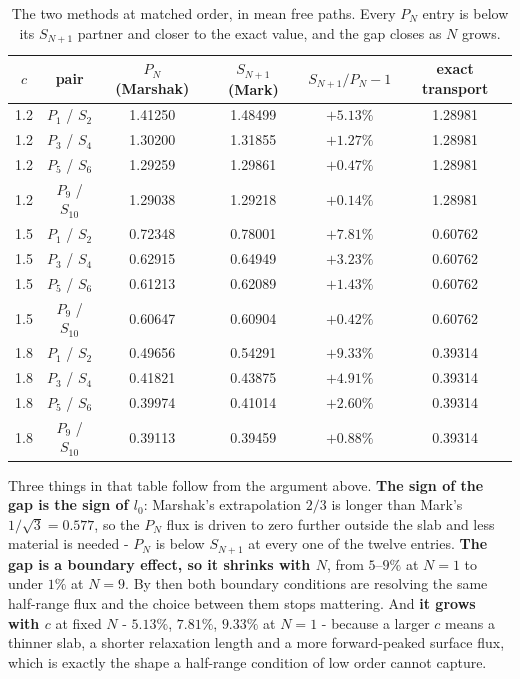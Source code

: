 \documentclass[11pt]{article}
\begin{document}
\begin{table}[htbp]
\centering
\begin{tabular}{cccccc}
\toprule
$c$ & pair & $P_N$ (Marshak) & $S_{N+1}$ (Mark) & $S_{N+1}/P_N - 1$ & exact transport \\
\midrule
1.2 & $P_1$ / $S_2$    & 1.41250 & 1.48499 & $+5.13\%$ & 1.28981 \\
1.2 & $P_3$ / $S_4$    & 1.30200 & 1.31855 & $+1.27\%$ & 1.28981 \\
1.2 & $P_5$ / $S_6$    & 1.29259 & 1.29861 & $+0.47\%$ & 1.28981 \\
1.2 & $P_9$ / $S_{10}$ & 1.29038 & 1.29218 & $+0.14\%$ & 1.28981 \\
\midrule
1.5 & $P_1$ / $S_2$    & 0.72348 & 0.78001 & $+7.81\%$ & 0.60762 \\
1.5 & $P_3$ / $S_4$    & 0.62915 & 0.64949 & $+3.23\%$ & 0.60762 \\
1.5 & $P_5$ / $S_6$    & 0.61213 & 0.62089 & $+1.43\%$ & 0.60762 \\
1.5 & $P_9$ / $S_{10}$ & 0.60647 & 0.60904 & $+0.42\%$ & 0.60762 \\
\midrule
1.8 & $P_1$ / $S_2$    & 0.49656 & 0.54291 & $+9.33\%$ & 0.39314 \\
1.8 & $P_3$ / $S_4$    & 0.41821 & 0.43875 & $+4.91\%$ & 0.39314 \\
1.8 & $P_5$ / $S_6$    & 0.39974 & 0.41014 & $+2.60\%$ & 0.39314 \\
1.8 & $P_9$ / $S_{10}$ & 0.39113 & 0.39459 & $+0.88\%$ & 0.39314 \\
\bottomrule
\end{tabular}
\caption{The two methods at matched order, in mean free paths. Every $P_N$ entry is below its
$S_{N+1}$ partner and closer to the exact value, and the gap closes as $N$ grows.}
\end{table}

Three things in that table follow from the argument above. \textbf{The sign of the gap is the
sign of $l_0$}: Marshak's extrapolation $2/3$ is longer than Mark's $1/\sqrt3 = 0.577$, so the
$P_N$ flux is driven to zero further outside the slab and less material is needed - $P_N$ is
below $S_{N+1}$ at every one of the twelve entries. \textbf{The gap is a boundary effect, so it
shrinks with $N$}, from $5$--$9\%$ at $N=1$ to under $1\%$ at $N=9$. By then both boundary
conditions are resolving the same half-range flux and the choice between them stops mattering.
And \textbf{it grows with $c$} at fixed $N$ - $5.13\%$, $7.81\%$, $9.33\%$ at $N=1$ -
because a larger $c$ means a thinner slab, a shorter relaxation length and a more forward-peaked
surface flux, which is exactly the shape a half-range condition of low order cannot capture.
\end{document}
